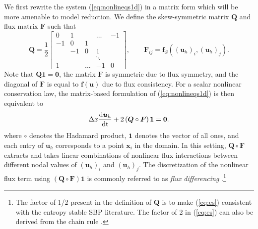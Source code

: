 \documentclass[review]{siamart171218}
\theoremstyle{assumption}
\newcommand{\td}[2]{\frac{{\rm d}#1}{{\rm d}{\rm #2}}}
\newcommand{\LRp}[1]{\left( #1 \right)}
\begin{document}
We first rewrite the system (\ref{eq:nonlineqs1d}) in a matrix form which will be more amenable to model reduction.  We define the skew-symmetric matrix $\bm{Q}$ and flux matrix $\bm{F}$ such that
\begin{equation}
\bm{Q} = \frac{1}{2}\begin{bmatrix}
0 & 1 & &\ldots & -1\\
-1 & 0 & 1 &&  \\
& -1 & 0 & 1 &  \\
 & & & \ddots &  \\
1 & &\ldots  & -1 & 0
\end{bmatrix}, \qquad \bm{F}_{ij} = \bm{f}_{S}\LRp{\LRp{\bm{u}_h}_i, \LRp{\bm{u}_h}_j}.
\label{eq:Qmat}
\end{equation}
Note that $\bm{Q}\bm{1} = \bm{0}$, the matrix $\bm{F}$ is symmetric due to flux symmetry, and the diagonal of $\bm{F}$ is equal to $\bm{f}(\bm{u})$ due to flux consistency.  For a scalar nonlinear conservation law, the matrix-based formulation of (\ref{eq:nonlineqs1d}) is then equivalent to
\begin{align}
\Delta x \td{\bm{u}_h}{t} + 2\LRp{{\bm{Q}}\circ \bm{F}}\bm{1} = \bm{0}.
\label{eq:es}
\end{align}
where $\circ$ denotes the Hadamard product, $\bm{1}$ denotes the vector of all ones, and each entry of $\bm{u}_h$ corresponds to a point $\bm{x}_i$ in the domain.  In this setting, $\bm{Q}\circ\bm{F}$ extracts and takes linear combinations of nonlinear flux interactions between different nodal values of $(\bm{u}_h)_i$ and $(\bm{u}_h)_j$.  The discretization of the nonlinear flux term using $\LRp{\bm{Q}\circ \bm{F}}\bm{1}$ is commonly referred to as \textit{flux differencing} \cite{carpenter2014entropy, gassner2016split, chen2017entropy, crean2018entropy, chan2017discretely}.\footnote{The factor of 1/2 present in the definition of $\bm{Q}$ is to make (\ref{eq:es}) consistent with the entropy stable SBP literature.  The factor of 2 in (\ref{eq:es}) can also be derived from the chain rule \cite{chen2017entropy, crean2018entropy}.  }
\end{document}
